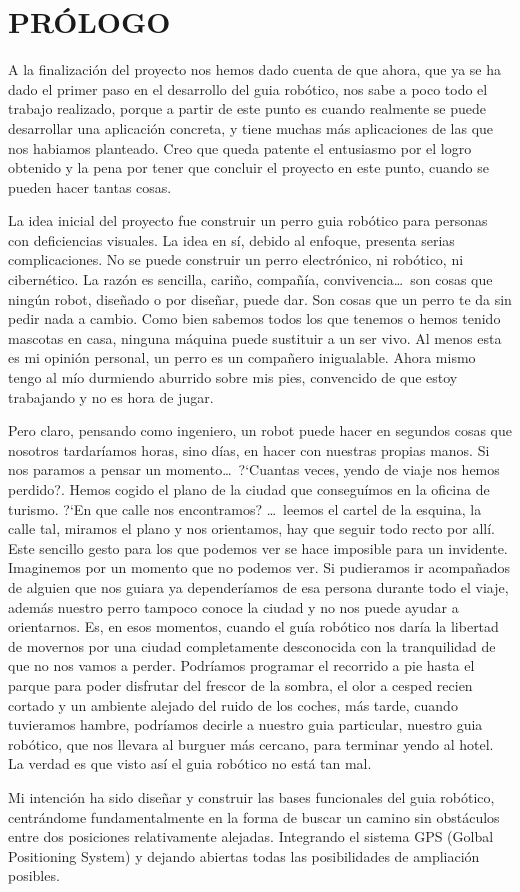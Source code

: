 \chapter*{PRÓLOGO}

A la finalización del proyecto nos hemos dado cuenta de que ahora, que ya se ha dado el primer paso en el desarrollo del guia robótico, nos sabe a poco todo el trabajo realizado, porque a partir de este punto es cuando realmente se puede desarrollar una aplicación concreta, y tiene muchas más aplicaciones de las que nos habiamos planteado. Creo que queda patente el entusiasmo por el logro obtenido y la pena por tener que concluir el proyecto en este punto, cuando se pueden hacer tantas cosas.\par
La idea inicial del proyecto fue construir un perro guia robótico para personas con deficiencias visuales. La idea en sí, debido al enfoque, presenta serias complicaciones. No se puede construir un perro electrónico, ni robótico, ni cibernético. La razón es sencilla, cariño, compañía, convivencia\dots \ son cosas que ningún robot, diseñado o por diseñar, puede dar. Son cosas que un perro te da sin pedir nada a cambio. Como bien sabemos todos los que tenemos o hemos tenido mascotas en casa, ninguna máquina puede sustituir a un ser vivo. Al menos esta es mi opinión personal, un perro es un compañero inigualable. Ahora mismo tengo al mío durmiendo aburrido sobre mis pies, convencido de que estoy trabajando y no es hora de jugar.\par
Pero claro, pensando como ingeniero, un robot puede hacer en segundos cosas que nosotros tardaríamos horas, sino días, en hacer con nuestras propias manos. Si nos paramos a pensar un momento\dots \ ?`Cuantas veces, yendo de viaje nos hemos perdido?. Hemos cogido el plano de la ciudad que conseguímos en la oficina de turismo. ?`En que calle nos encontramos? \dots~leemos el cartel de la esquina, la calle tal, miramos el plano y nos orientamos, hay que seguir todo recto por allí. Este sencillo gesto para los que podemos ver se hace imposible para un invidente. Imaginemos por un momento que no podemos ver. Si pudieramos ir acompañados de alguien que nos guiara ya dependeríamos de esa persona durante todo el viaje, además nuestro perro tampoco conoce la ciudad y no nos puede ayudar a orientarnos. Es, en esos momentos, cuando el guía robótico nos daría la libertad de movernos por una ciudad completamente desconocida con la tranquilidad de que no nos vamos a perder. Podríamos programar el recorrido a pie hasta el parque para poder disfrutar del frescor de la sombra, el olor a cesped recien cortado y un ambiente alejado del ruido de los coches, más tarde, cuando tuvieramos hambre, podríamos decirle a nuestro guia particular, nuestro guia robótico, que nos llevara al burguer más cercano, para terminar yendo al hotel. La verdad es que visto así el guia robótico no está tan mal.\par
Mi in\-ten\-ción ha si\-do di\-se\-ñar y cons\-truir las ba\-ses fun\-cio\-na\-les del guia ro\-bó\-ti\-co, centrándome fundamentalmente en la forma de buscar un camino sin obstáculos entre dos posiciones relativamente alejadas. Integrando el sistema GPS (Golbal Positioning System) y dejando abiertas todas las posibilidades de ampliación posibles.\par
